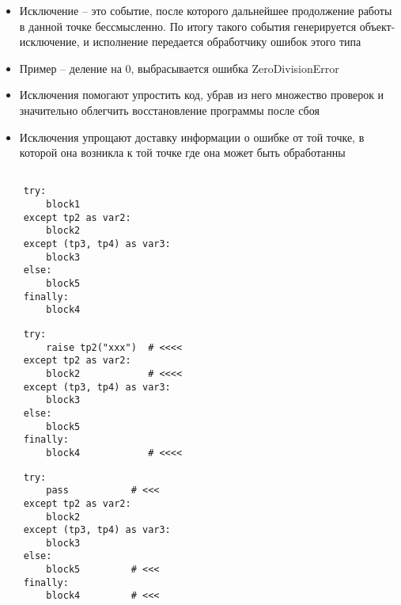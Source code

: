 \documentclass{article}
\begin{document}
\LARGE


\begin{itemize}
\item Исключение – это событие, после которого дальнейшее продолжение 
		работы в данной точке бессмысленно. По итогу такого события 
		генерируется объект-исключение, и исполнение передается обработчику 
		ошибок этого типа
\item Пример – деление на 0, выбрасывается ошибка ZeroDivisionError
\item Исключения помогают упростить код, убрав из него множество 
		проверок и значительно облегчить восстановление программы после сбоя
\item Исключения упрощают доставку информации о ошибке от той точке, 
		в которой она возникла к той точке где она может быть обработанны
\end{itemize}
\newpage



{
\LARGE \vspace{15pt}
\begin{lstlisting}

	try:
		block1
	except tp2 as var2:
		block2
	except (tp3, tp4) as var3:
		block3
	else:
		block5
	finally:
		block4

\end{lstlisting}
}
\newpage

{
\LARGE \vspace{15pt}
\begin{lstlisting}
	try:
		raise tp2("xxx")  # <<<<
	except tp2 as var2:
		block2            # <<<<
	except (tp3, tp4) as var3:
		block3
	else:
		block5
	finally:
		block4            # <<<<
\end{lstlisting}
}

\newpage

{
\LARGE \vspace{15pt}
\begin{lstlisting}
	try:
		pass           # <<<
	except tp2 as var2:
		block2
	except (tp3, tp4) as var3:
		block3
	else:
		block5         # <<<
	finally:
		block4         # <<<
\end{lstlisting}
}
\end{document}
